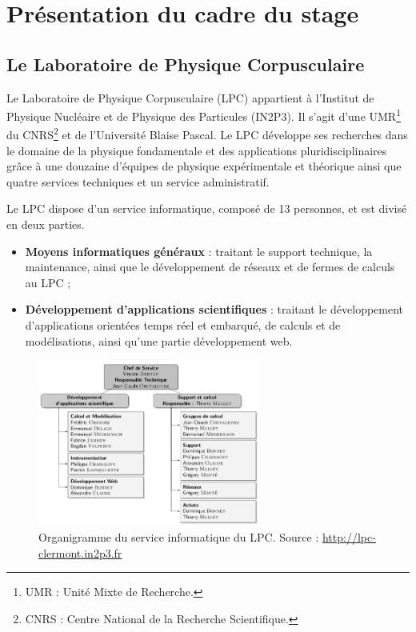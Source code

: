 
\section{Présentation du cadre du stage}

	\subsection[LPC-Clermont]{Le Laboratoire de Physique Corpusculaire}

Le Laboratoire de Physique Corpusculaire (LPC) appartient à l'Institut de Physique Nucléaire et de Physique des Particules (IN2P3). Il s'agit d'une UMR\footnote{UMR : Unité Mixte de Recherche.} du CNRS\footnote{CNRS : Centre National de la Recherche Scientifique.} et de l'Université Blaise Pascal. Le LPC développe ses recherches dans le domaine de la physique fondamentale et des applications pluridisciplinaires grâce à une douzaine d'équipes de physique expérimentale et théorique ainsi que quatre services techniques et un service administratif.

Le LPC dispose d'un service informatique, composé de 13 personnes, et est divisé en deux parties.
	\begin{itemize}
		\item \textbf{Moyens informatiques généraux} : traitant le support technique, la maintenance, ainsi que le développement de réseaux et de fermes de calculs au LPC ;
		\item \textbf{Développement d'applications scientifiques} : traitant le développement d'applications orientées temps réel et embarqué, de calculs et de modélisations, ainsi qu'une partie développement web.
	\end{itemize}

	\begin{figure}[h]
		\centering
		\includegraphics[width=0.65\textwidth]{img/lpc-orga-si.png}
		\caption[Organigramme du service informatique du LPC]{Organigramme du service informatique du LPC. Source : \url{http://lpc-clermont.in2p3.fr} }
	\end{figure}

